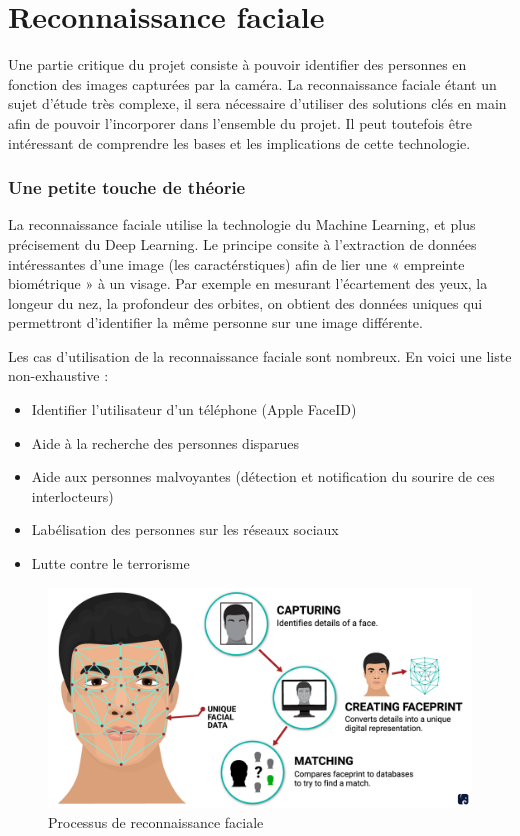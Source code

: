 \chapter{Reconnaissance faciale}
\label{ch:reco_faciale}

Une partie critique du projet consiste à pouvoir identifier des personnes en fonction des images capturées par la
caméra. La reconnaissance faciale étant un sujet d’étude très complexe, il sera nécessaire d’utiliser des solutions
clés en main afin de pouvoir l’incorporer dans l’ensemble du projet. Il peut toutefois être intéressant de
comprendre les bases et les implications de cette technologie.

\subsection{Une petite touche de théorie}
La reconnaissance faciale utilise la technologie du Machine Learning, et plus précisement du Deep Learning.
Le principe consite à l’extraction de données intéressantes d’une image (les caractérstiques) afin de lier une
« empreinte biométrique » à un visage. Par exemple en mesurant l’écartement des yeux, la longeur du nez, la
profondeur des orbites, on obtient des données uniques qui permettront d’identifier la même personne sur une
image différente.

Les cas d’utilisation de la reconnaissance faciale sont nombreux.
En voici une liste non-exhaustive :
\begin{itemize}
\item Identifier l’utilisateur d’un téléphone (Apple FaceID)
\item Aide à la recherche des personnes disparues
\item Aide aux personnes malvoyantes (détection et notification du sourire de ces interlocteurs)
\item Labélisation des personnes sur les réseaux sociaux
\item Lutte contre le terrorisme
\end{itemize}

\begin{figure}[H]
	\centering
	\includegraphics[width=12cm]{images/proto-5.png}
	\caption{Processus de reconnaissance faciale}
	\label{fig:arealytics}
\end{figure}


